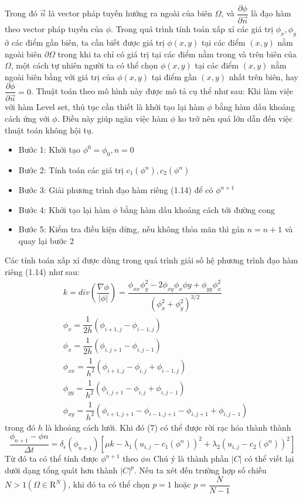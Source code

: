 \documentclass[12pt,oneside,a4]{report}
\begin{document}
Trong đó $\vec{n}$ là vector pháp tuyến hướng ra ngoài của biên $\Omega$, và $\dfrac{\partial \phi}{\partial \vec{n}} $ là đạo hàm theo vector pháp tuyến của $\phi$. Trong quá trình tính toán xấp xỉ các giá trị $\phi_x, \phi_y$ ở các điểm gần biên, ta cần biết được giá trị $\phi(x,y)$ tại các điểm $(x, y)$ nằm ngoài biên $\partial \Omega$ trong khi ta chỉ có giá trị tại các điểm nằm trong và trên biên của $\Omega$, một cách tự nhiên người ta có thể chọn $\phi(x,y)$ tại các điểm $(x, y)$ nằm ngoài biên bằng với giá trị của $\phi(x,y)$ tại điểm gần $(x,y)$  nhất trên biên, hay $\dfrac{\partial \phi}{\partial \vec{n}}=0$. Thuật toán theo mô hình này được mô tả cụ thể như sau:
Khi làm việc với hàm Level set, thủ tục cần thiết là khởi tạo lại hàm $\phi$ bằng hàm dấu khoảng cách ứng với $\phi$. Điều này giúp ngăn việc hàm $\phi$ ko trở nên quá lớn dẫn đến việc thuật toán không hội tụ.
\begin{itemize}
\item Bước 1: Khởi tạo $\phi^0=\phi_0, n=0$
\item Bước 2: Tính toán các giá trị $c_1(\phi^n), c_2(\phi^n)$
\item Bước 3: Giải phương trình đạo hàm riêng (1.14) để có $\phi^{n+1}$
\item Bước 4: Khởi tạo lại hàm $\phi$ bằng hàm dấu khoảng cách tới đường cong
\item Bước 5: Kiểm tra điều kiện dừng, nếu không thỏa mãn thì gán $n=n+1$ và quay lại bước 2
\end{itemize}
Các tính toán xấp xỉ được dùng trong quá trình giải số hệ phương trình đạo hàm riêng (1.14) như sau:
\begin{equation}
\begin{split}
&k=div(\dfrac{\nabla \phi}{|\phi|})=\dfrac{\phi_{xx}\phi^2_{y}-2\phi_{xy}\phi_{x}\phi{y}+\phi_{yy}\phi^2_{x}}{(\phi^2_x+\phi^2_y)^{3/2}}\\
&\phi_x= \dfrac{1}{2h}(\phi_{i+1,j}-\phi_{i-1,j}) \\ 
&\phi_x= \dfrac{1}{2h}(\phi_{i,j+1}-\phi_{i,j-1}) \\
&\phi_{xx}= \dfrac{1}{h^2}(\phi_{i+1,j}-\phi_{i,j}+\phi_{i-1,j}) \\
&\phi_{yy}= \dfrac{1}{h^2}(\phi_{i,j+1}-\phi_{i,j}+\phi_{i,j-1}) \\
&\phi_{xy}= \dfrac{1}{h^2}(\phi_{i+1,j+1}-\phi_{i-1,j+1}-\phi_{i,j+1}+\phi_{i,j-1}) 
\end{split}
\end{equation}
trong đó $h$ là khoảng cách lưới. Khi đó (7) có thể được rời rạc hóa thành thành
\begin{equation}
\dfrac{\phi_{n+1}-\phi{n}}{\Delta t}=\delta_{\epsilon}(\phi_{n+1})[\mu k-\lambda_1 (u_{i,j}-c_1(\phi^{n}))^2+\lambda_2 (u_{i,j}-c_2(\phi^{n}))^2]
\end{equation}
Từ đó ta có thể tính được $\phi^{n+1}$ theo $\phi{n}$
Chú ý là thành phần $|C|$ có thể viết lại dưới dạng tổng quát hơn thành $|C|^p$. Nếu ta xét đến trường hợp số chiều $N>1(\Omega \in \mathrm{R}^N )$, khi đó ta có thể chọn $p=1$ hoặc $p=\dfrac{N}{N-1}$
\end{document}
